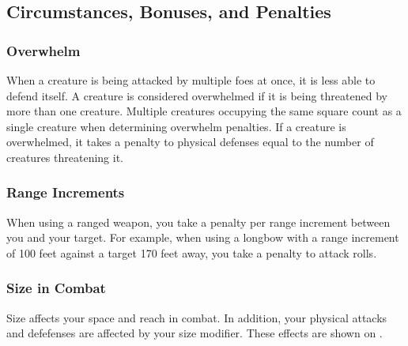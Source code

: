\subsection{Circumstances, Bonuses, and Penalties}

\subsubsection{Overwhelm}\label{Overwhelm}
When a creature is being attacked by multiple foes at once, it is less able to defend itself. A creature is considered overwhelmed if it is being threatened by more than one creature. Multiple creatures occupying the same square count as a single creature when determining overwhelm penalties. If a creature is overwhelmed, it takes a penalty to physical defenses equal to the number of creatures threatening it.

\subsubsection{Range Increments}
When using a ranged weapon, you take a  penalty per range increment between you and your target. For example, when using a longbow with a range increment of 100 feet against a target 170 feet away, you take a  penalty to attack rolls.

\subsubsection{Size in Combat}\label{Size in Combat}
Size affects your space and reach in combat. In addition, your physical attacks and defefenses are affected by your size modifier. These effects are shown on . 

